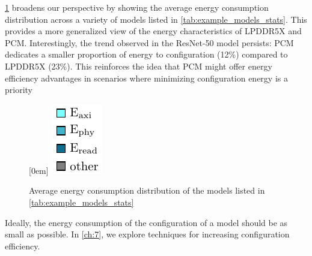 
\cref{fig:example_models_avg_conf_proc} broadens our perspective by showing the average energy consumption distribution across a variety of models listed in \cref{tab:example_models_stats}.
This provides a more generalized view of the energy characteristics of LPDDR5X and PCM.
Interestingly, the trend observed in the ResNet-50 model persists: PCM dedicates a smaller proportion of energy to configuration (12\%) compared to LPDDR5X (23\%).
This reinforces the idea that PCM might offer energy efficiency advantages in scenarios where minimizing configuration energy is a priority

\begin{figure}[hbtp]
    \centering
    \hfill
    \subcaptionbox*{}[0em]{
        \includegraphics{assets/legend.pdf}
    }
    \hfill
    \caption{Average energy consumption distribution of the models listed in \cref{tab:example_models_stats}}
    \label{fig:example_models_avg_conf_proc}
\end{figure}

Ideally, the energy consumption of the configuration of a model should be as small as possible.
In \cref{ch:7}, we explore techniques for increasing configuration efficiency.

